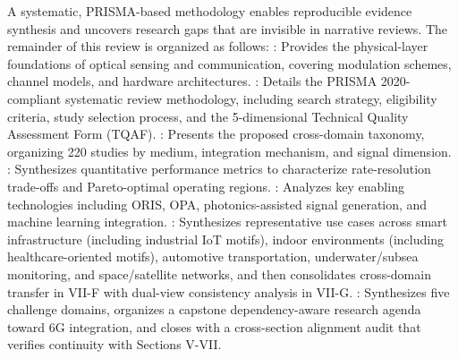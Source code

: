 \markdownRendererOlEnd \markdownRendererInterblockSeparator
{}\markdownRendererBlockQuoteBegin
{} A systematic, PRISMA-based methodology enables reproducible evidence synthesis and uncovers research gaps that are invisible in narrative reviews.\markdownRendererBlockQuoteEnd \markdownRendererInterblockSeparator
{}
\markdownRendererSectionEnd \markdownRendererSectionBegin
{}\markdownRendererInterblockSeparator
{}The remainder of this review is organized as follows:\markdownRendererInterblockSeparator
{}\markdownRendererUlBegin
\markdownRendererUlItem {}: Provides the physical-layer foundations of optical sensing and communication, covering modulation schemes, channel models, and hardware architectures.\markdownRendererUlItemEnd 
\markdownRendererUlItem {}: Details the PRISMA 2020-compliant systematic review methodology, including search strategy, eligibility criteria, study selection process, and the 5-dimensional Technical Quality Assessment Form (TQAF).\markdownRendererUlItemEnd 
\markdownRendererUlItem {}: Presents the proposed cross-domain taxonomy, organizing 220 studies by medium, integration mechanism, and signal dimension.\markdownRendererUlItemEnd 
\markdownRendererUlItem {}: Synthesizes quantitative performance metrics to characterize rate-resolution trade-offs and Pareto-optimal operating regions.\markdownRendererUlItemEnd 
\markdownRendererUlItem {}: Analyzes key enabling technologies including ORIS, OPA, photonics-assisted signal generation, and machine learning integration.\markdownRendererUlItemEnd 
\markdownRendererUlItem {}: Synthesizes representative use cases across smart infrastructure (including industrial IoT motifs), indoor environments (including healthcare-oriented motifs), automotive transportation, underwater/subsea monitoring, and space/satellite networks, and then consolidates cross-domain transfer in VII-F with dual-view consistency analysis in VII-G.\markdownRendererUlItemEnd 
\markdownRendererUlItem {}: Synthesizes five challenge domains, organizes a capstone dependency-aware research agenda toward 6G integration, and closes with a cross-section alignment audit that verifies continuity with Sections V-VII.\markdownRendererUlItemEnd 
